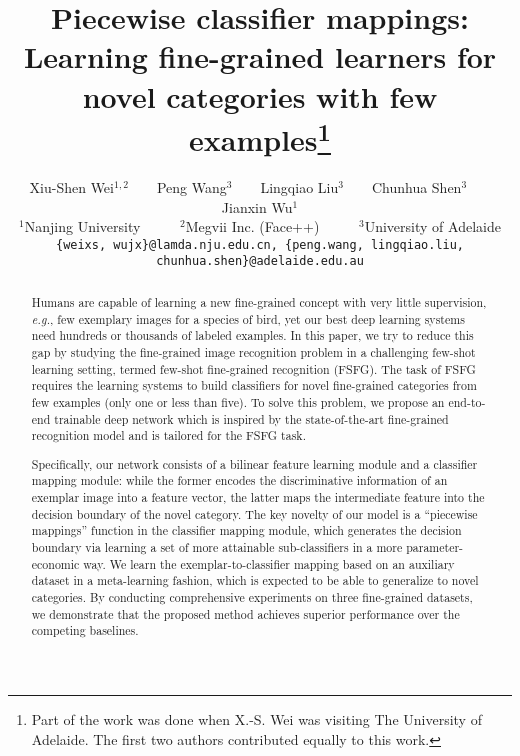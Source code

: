 \documentclass[10pt,twocolumn,letterpaper]{article}
\begin{document}
\title{Piecewise classifier mappings:\\Learning fine-grained learners for novel categories with few examples\thanks{Part of the work was done when X.-S. Wei was visiting The University of Adelaide. The first two authors contributed equally to this work.}}

\author{Xiu-Shen Wei$^{1,2}$ ~ ~ Peng Wang$^3$ ~ ~ Lingqiao Liu$^3$ ~ ~ Chunhua Shen$^3$ ~ ~ Jianxin Wu$^1$\\
$^1$Nanjing University ~ ~ ~
$^2$Megvii Inc. (Face++) ~ ~ ~
$^3$University of Adelaide
\\ {\tt\small \{weixs, wujx\}@lamda.nju.edu.cn, \{peng.wang, lingqiao.liu, chunhua.shen\}@adelaide.edu.au}
}

\maketitle

\begin{abstract}
Humans are capable of learning a new fine-grained concept with very little supervision, \emph{e.g.}, few exemplary images for a species of bird, yet our best deep learning systems need hundreds or thousands of labeled examples. In this paper, we try to reduce this gap by studying the fine-grained image recognition problem in a challenging few-shot learning setting, termed few-shot fine-grained recognition (FSFG). The task of FSFG requires the learning systems to build classifiers for novel fine-grained categories from few examples (only one or less than five). To solve this problem, we propose an end-to-end trainable deep network which is inspired by the state-of-the-art fine-grained recognition model and is tailored for the FSFG task.

Specifically, our network consists of a bilinear feature learning module and a classifier mapping module: while the former encodes the discriminative information of an exemplar image into a feature vector, the latter maps the intermediate feature into the decision boundary of the novel category. The key novelty of our model is a ``piecewise mappings'' function in the classifier mapping module, which generates the decision boundary via learning a set of more attainable sub-classifiers in a more parameter-economic way. We learn the exemplar-to-classifier mapping based on an auxiliary dataset in a meta-learning fashion, which is expected to be able to generalize to novel categories. By conducting comprehensive experiments on three fine-grained datasets, we demonstrate that the proposed method achieves superior performance over the competing baselines.
\end{abstract}
\end{document}
